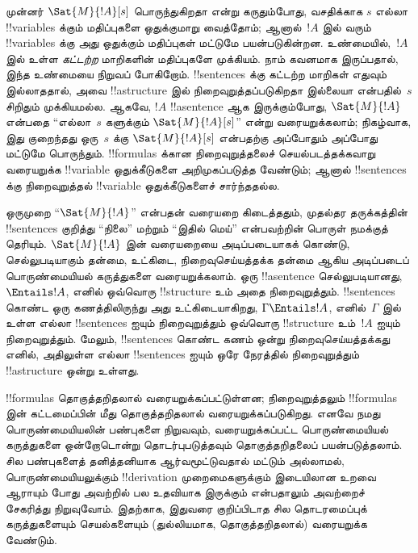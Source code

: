 \documentclass[../../../include/open-logic-section]{subfiles}
\begin{document}


முன்னர் $\Sat{M}{!A}[s]$ பொருந்துகிறதா என்று கருதும்போது, வசதிக்காக $s$
எல்லா !!{variable}s க்கும் மதிப்புகளை ஒதுக்குமாறு வைத்தோம்; ஆனால்~$!A$ இல்
வரும் !!{variable}s க்கு அது ஒதுக்கும் மதிப்புகள் மட்டுமே பயன்படுகின்றன.
உண்மையில்,~$!A$ இல் உள்ள \emph{கட்டற்ற} மாறிகளின் மதிப்புகளே முக்கியம்.
நாம் கவனமாக இருப்பதால், இந்த உண்மையை நிறுவப் போகிறோம். !!{sentence}s க்கு
கட்டற்ற மாறிகள் எதுவும் இல்லாததால், அவை !!a{structure} இல்
நிறைவுறுத்தப்படுகிறதா இல்லையா என்பதில்~$s$ சிறிதும் முக்கியமல்ல. ஆகவே, $!A$
!!a{sentence} ஆக இருக்கும்போது, $\Sat{M}{!A}$ என்பதை
``எல்லா~$s$ களுக்கும் $\Sat{M}{!A}[s]$'' என்று வரையறுக்கலாம்; நிகழ்வாக,
இது குறைந்தது ஒரு~$s$ க்கு $\Sat{M}{!A}[s]$ என்பதற்கு அப்போதும் அப்போது
மட்டுமே பொருந்தும். !!{formula}s க்கான நிறைவுறுத்தலைச் செயல்படத்தக்கவாறு
வரையறுக்க !!{variable} ஒதுக்கீடுகளை அறிமுகப்படுத்த வேண்டும்; ஆனால்
!!{sentence}s க்கு நிறைவுறுத்தல் !!{variable} ஒதுக்கீடுகளைச் சார்ந்ததல்ல.

ஒருமுறை ``$\Sat{M}{!A}$'' என்பதன் வரையறை கிடைத்ததும், முதல்தர தருக்கத்தின்
!!{sentence}s குறித்து ``நிலை'' மற்றும் ``இதில் மெய்'' என்பவற்றின் பொருள்
நமக்குத் தெரியும். $\Sat{M}{!A}$ இன் வரையறையை அடிப்படையாகக் கொண்டு,
செல்லுபடியாகும் தன்மை, உட்கிடை, நிறைவுசெய்யத்தக்க தன்மை ஆகிய அடிப்படைப்
பொருண்மையியல் கருத்துகளை வரையறுக்கலாம். ஒரு !!a{sentence} செல்லுபடியானது,
$\Entails !A$, எனில் ஒவ்வொரு !!{structure} உம் அதை நிறைவுறுத்தும்.
!!{sentence}s கொண்ட ஒரு கணத்திலிருந்து அது உட்கிடையாகிறது,
$\Gamma \Entails !A$, எனில்~$\Gamma$ இல் உள்ள எல்லா !!{sentence}s ஐயும்
நிறைவுறுத்தும் ஒவ்வொரு !!{structure} உம்~$!A$ ஐயும் நிறைவுறுத்தும். மேலும்,
!!{sentence}s கொண்ட கணம் ஒன்று நிறைவுசெய்யத்தக்கது எனில், அதிலுள்ள எல்லா
!!{sentence}s ஐயும் ஒரே நேரத்தில் நிறைவுறுத்தும் !!a{structure} ஒன்று உள்ளது.

!!{formula}s தொகுத்தறிதலால் வரையறுக்கப்பட்டுள்ளன; நிறைவுறுத்தலும்
!!{formula}s இன் கட்டமைப்பின் மீது தொகுத்தறிதலால் வரையறுக்கப்படுகிறது.
எனவே நமது பொருண்மையியலின் பண்புகளை நிறுவவும், வரையறுக்கப்பட்ட
பொருண்மையியல் கருத்துகளை ஒன்றோடொன்று தொடர்புபடுத்தவும் தொகுத்தறிதலைப்
பயன்படுத்தலாம். சில பண்புகளைத் தனித்தனியாக ஆர்வமூட்டுவதால் மட்டும் அல்லாமல்,
பொருண்மையியலுக்கும் !!{derivation} முறைமைகளுக்கும் இடையிலான உறவை ஆராயும்
போது அவற்றில் பல உதவியாக இருக்கும் என்பதாலும் அவற்றைச் சேகரித்து நிறுவுவோம்.
இதற்காக, இதுவரை குறிப்பிடாத சில தொடரமைப்புக் கருத்துகளையும் செயல்களையும்
(துல்லியமாக, தொகுத்தறிதலால்) வரையறுக்க வேண்டும்.
\end{document}
